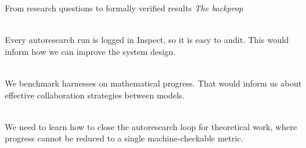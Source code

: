 \documentclass[aspectratio=169, 11pt, t]{beamer}
\newcommand{\muted}[1]{{\color{vmmuted}#1}}
\newcommand{\slidesubtitle}[1]{\muted{\itshape #1\vphantom{bgjpqy}}\par}
\newcommand{\num}[1]{{\color{vmcoral}\bfseries\fontsize{20}{20}\selectfont #1}}
\newcommand{\point}[3]{%
  \par\noindent\begin{minipage}[t]{0.9cm}\vspace{0pt}\num{#1}\end{minipage}%
  \begin{minipage}[t]{\dimexpr\linewidth-0.9cm\relax}\raggedright
    \vspace{0pt}{\bfseries #2}\\[0.05cm]{\color{vmnavy!85}#3}\end{minipage}\par}
\begin{document}
\begin{frame}{From research questions to formally verified results}
  \vspace{-0.3cm}
  \centering
  \slidesubtitle{The backprop}

  \vspace{0.5cm}
  \begin{minipage}{0.92\textwidth}
    \small
    \point{4}{Inspecting the logs}
      {Every autoresearch run is logged in Inspect, so it is easy to audit. This would inform how we can improve the system design.}

    \vspace{0.5cm}
    \point{5}{Comparing harnesses}
      {We benchmark harnesses on mathematical progress. That would inform us about effective collaboration strategies between models.}

    \vspace{0.5cm}
    \point{6}{Steering autoresearch runs}
      {We need to learn how to close the autoresearch loop for theoretical work, where progress cannot be reduced to a single machine-checkable metric.}
  \end{minipage}
\end{frame}
\end{document}
